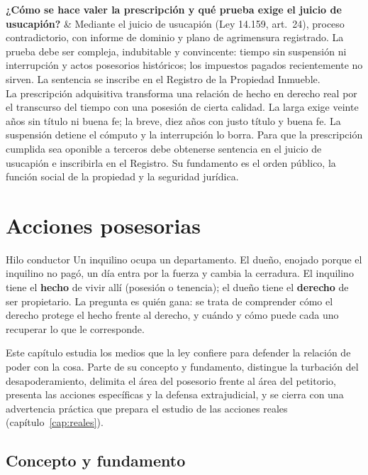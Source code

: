 \documentclass[12pt,oneside]{book}
\newcommand{\cq}[2]{\textbf{#1} & #2 \\[0.45em]}
\begin{document}
{\cq{¿Cómo se hace valer la prescripción y qué prueba exige el juicio de usucapión?}{Mediante el juicio de usucapión (Ley 14.159, art.~24), proceso contradictorio, con informe de dominio y plano de agrimensura registrado. La prueba debe ser compleja, indubitable y convincente: tiempo sin suspensión ni interrupción y actos posesorios históricos; los impuestos pagados recientemente no sirven. La sentencia se inscribe en el Registro de la Propiedad Inmueble.}
}{La prescripción adquisitiva transforma una relación de hecho en derecho real por el transcurso del tiempo con una posesión de cierta calidad. La larga exige veinte años sin título ni buena fe; la breve, diez años con justo título y buena fe. La suspensión detiene el cómputo y la interrupción lo borra. Para que la prescripción cumplida sea oponible a terceros debe obtenerse sentencia en el juicio de usucapión e inscribirla en el Registro. Su fundamento es el orden público, la función social de la propiedad y la seguridad jurídica.}

\chapter{Acciones posesorias}\label{cap:posesorias}

\begin{ejemplo}{Hilo conductor}
Un inquilino ocupa un departamento. El dueño, enojado porque el inquilino no pagó, un día entra por la fuerza y cambia la cerradura. El inquilino tiene el \textbf{hecho} de vivir allí (posesión o tenencia); el dueño tiene el \textbf{derecho} de ser propietario. La pregunta es quién gana: se trata de comprender cómo el derecho protege el hecho frente al derecho, y cuándo y cómo puede cada uno recuperar lo que le corresponde.
\end{ejemplo}

Este capítulo estudia los medios que la ley confiere para defender la relación de poder con la cosa. Parte de su concepto y fundamento, distingue la turbación del desapoderamiento, delimita el área del posesorio frente al área del petitorio, presenta las acciones específicas y la defensa extrajudicial, y se cierra con una advertencia práctica que prepara el estudio de las acciones reales (capítulo~\ref{cap:reales}).

\section{Concepto y fundamento}
\end{document}
